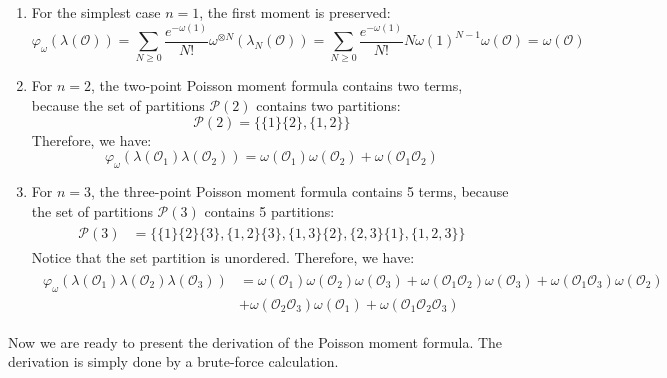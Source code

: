 \documentclass[a4paper,11pt]{article}
\theoremstyle{definition}
\numberwithin{equation}{section}
\begin{document}
\begin{enumerate}
    \item For the simplest case $n = 1$, the first moment is preserved:
    \begin{equation}
        \varphi_\omega(\lambda(\mathcal{O})) = \sum_{N\geq 0}\frac{e^{-\omega(1)}}{N!}\omega^{\otimes N}(\lambda_N(\mathcal{O})) = \sum_{N\geq 0}\frac{e^{-\omega(1)}}{N!}N\omega(1)^{N-1}\omega(\mathcal{O}) = \omega(\mathcal{O})
    \end{equation}
    \item For $n = 2$, the two-point Poisson moment formula contains two terms, because the set of partitions $\mathcal{P}(2)$ contains two partitions:
    \begin{equation}
        \mathcal{P}(2) = \{\{1\}\{2\}, \{1,2\}\}
    \end{equation}
    Therefore, we have:
    \begin{equation}
        \varphi_\omega(\lambda(\mathcal{O}_1)\lambda(\mathcal{O}_2)) = \omega(\mathcal{O}_1)\omega(\mathcal{O}_2) + \omega(\mathcal{O}_1\mathcal{O}_2)
    \end{equation}
    \item For $n =3$, the three-point Poisson moment formula contains 5 terms, because the set of partitions $\mathcal{P}(3)$ contains 5 partitions:
    \begin{align}
        \begin{split}
            \mathcal{P}(3)&=\{\{1\}\{2\}\{3\}, \{1,2\}\{3\}, \{1,3\}\{2\}, \{2,3\}\{1\}, \{1,2,3\}\}
        \end{split}        
    \end{align}
    Notice that the set partition is unordered. Therefore, we have:
    \begin{align}
        \begin{split}
            \varphi_\omega(\lambda(\mathcal{O}_1)\lambda(\mathcal{O}_2)\lambda(\mathcal{O}_3)) &= \omega(\mathcal{O}_1)\omega(\mathcal{O}_2)\omega(\mathcal{O}_3) + \omega(\mathcal{O}_1\mathcal{O}_2)\omega(\mathcal{O}_3) + \omega(\mathcal{O}_1\mathcal{O}_3)\omega(\mathcal{O}_2) \\&+ \omega(\mathcal{O}_2\mathcal{O}_3)\omega(\mathcal{O}_1) + \omega(\mathcal{O}_1\mathcal{O}_2\mathcal{O}_3)
        \end{split}
    \end{align}
\end{enumerate}
Now we are ready to present the derivation of the Poisson moment formula. The derivation is simply done by a brute-force calculation.
\end{document}
